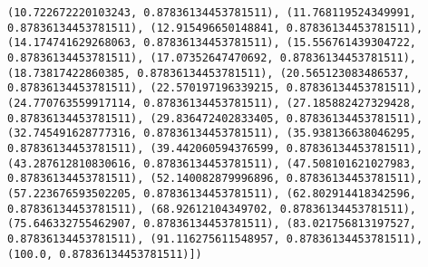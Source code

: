 \documentclass[11pt]{article}
\begin{document}
\begin{Verbatim}[commandchars=\\\{\}]
(10.722672220103243, 0.87836134453781511), (11.768119524349991, 0.87836134453781511), (12.915496650148841, 0.87836134453781511), (14.174741629268063, 0.87836134453781511), (15.556761439304722, 0.87836134453781511), (17.07352647470692, 0.87836134453781511), (18.73817422860385, 0.87836134453781511), (20.565123083486537, 0.87836134453781511), (22.570197196339215, 0.87836134453781511), (24.770763559917114, 0.87836134453781511), (27.185882427329428, 0.87836134453781511), (29.836472402833405, 0.87836134453781511), (32.745491628777316, 0.87836134453781511), (35.938136638046295, 0.87836134453781511), (39.442060594376599, 0.87836134453781511), (43.287612810830616, 0.87836134453781511), (47.508101621027983, 0.87836134453781511), (52.140082879996896, 0.87836134453781511), (57.223676593502205, 0.87836134453781511), (62.802914418342596, 0.87836134453781511), (68.92612104349702, 0.87836134453781511), (75.646332755462907, 0.87836134453781511), (83.021756813197527, 0.87836134453781511), (91.116275611548957, 0.87836134453781511), (100.0, 0.87836134453781511)])

    \end{Verbatim}
\end{document}
